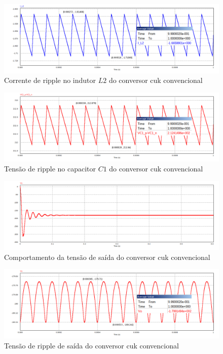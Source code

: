 \documentclass[
	12pt,				%
	openright,			%
	onseside,
	a4paper,			%
	english,			%
	french,				%
	spanish,			%
	brazil,				%
	]{abntex2}
\begin{document}
\begin{figure}[htbp]%
	\centering
		\includegraphics[width=0.8 \linewidth]{cuk_conv_ripp_I_L2}
		\caption{Corrente de ripple no indutor $L2$ do conversor cuk convencional}
		\label{fig:cuk_conv_ripp_I_L2}
\end{figure}

\begin{figure}[htbp]%
	\centering
		\includegraphics[width=0.8 \linewidth]{cuk_conv_ripp_V_C1}
		\caption{Tensão de ripple no capacitor $C1$ do conversor cuk convencional}
		\label{fig:cuk_conv_ripp_V_C1}
\end{figure}

\begin{figure}[htbp]%
	\centering
		\includegraphics[width=0.8 \linewidth]{cuk_conv_V_out}
		\caption{Comportamento da tensão de saída do conversor cuk convencional}
		\label{fig:cuk_conv_ripp_V_out}
\end{figure}

\begin{figure}[htbp]%
	\centering
		\includegraphics[width=0.8 \linewidth]{cuk_conv_ripp_V_out2}
		\caption{Tensão de ripple de saída do conversor cuk convencional}
		\label{fig:cuk_conv_ripp_V_out}
\end{figure}
\end{document}
